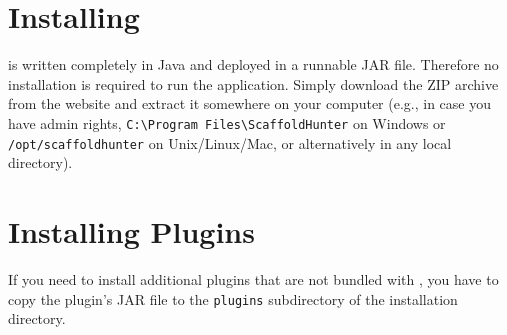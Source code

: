 \section{Installing \sh}
\sh is written completely in Java and deployed in a runnable JAR file.
Therefore no installation is required to run the application.
Simply download the \sh ZIP archive from the website and extract it somewhere on your computer (e.g., in case you
have admin rights, \verb+C:\Program Files\ScaffoldHunter+ on Windows or \verb+/opt/scaffoldhunter+ on Unix/Linux/Mac,
or alternatively in any local directory).


\section{Installing Plugins}
If you need to install additional plugins that are not bundled with \sh, you have to copy the plugin's JAR file to the \texttt{plugins} subdirectory of the \sh installation directory.
